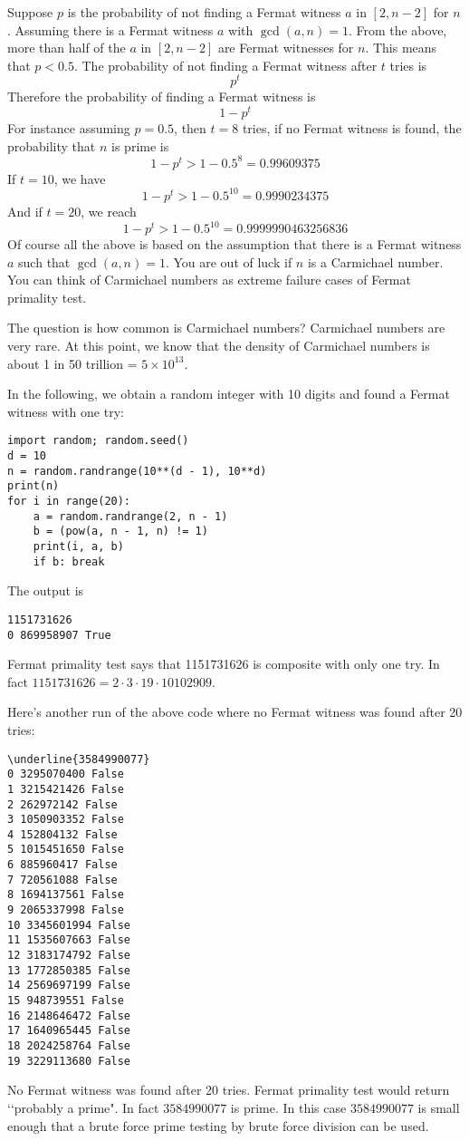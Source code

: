 Suppose $p$ is the probability of not finding a Fermat witness
$a$ in $[2, n-2]$ for $n$.
Assuming there is a Fermat witness $a$ with $\gcd(a, n) = 1$.
From the above, more than half of the $a$ in $[2, n - 2]$ are Fermat
witnesses for $n$.
This means that $p < 0.5$.
The probability of not finding a Fermat witness after $t$ tries is
\[
p^{t}
\]
Therefore the probability of finding a Fermat witness is
\[
1 - p^t
\]
For instance assuming $p = 0.5$, then $t=8$ tries,
if no Fermat witness is found, the probability that $n$ is prime is
\[
1 - p^t > 1 - 0.5^8 = 0.99609375
\]
If $t = 10$, we have
\[
1 - p^t > 1 - 0.5^{10} = 0.9990234375
\]
And if $t = 20$, we reach
\[
1 - p^t > 1 - 0.5^{10} = 0.9999990463256836
\]
Of course all the above is based on the assumption that there is
a Fermat witness $a$ such that $\gcd(a, n) = 1$.
You are out of luck if $n$ is a Carmichael number.
You can think of Carmichael numbers as extreme failure cases of Fermat
primality test.

The question is how common is Carmichael numbers?
Carmichael numbers are very rare.
At this point, we know that the density of Carmichael numbers
is about 1 in 50 trillion = $5 \times 10^{13}$.

\begin{eg}
In the following, we obtain a random integer with 10 digits
and found a Fermat witness with one try:
\begin{Verbatim}[fontsize=\footnotesize,frame=single]
import random; random.seed()
d = 10
n = random.randrange(10**(d - 1), 10**d)
print(n)
for i in range(20):
    a = random.randrange(2, n - 1)
    b = (pow(a, n - 1, n) != 1)
    print(i, a, b)
    if b: break
\end{Verbatim}
The output is
\begin{Verbatim}[fontsize=\footnotesize,frame=single]
1151731626
0 869958907 True
\end{Verbatim}
Fermat primality test says that 1151731626 is composite with only one try.
In fact $1151731626 = 2 \cdot 3 \cdot 19 \cdot 10102909$.
\end{eg}

\begin{eg}
Here's another run of the above code where no Fermat witness was found
after 20 tries:
\begin{Verbatim}[fontsize=\footnotesize,frame=single,commandchars=\\\{\}]
\underline{3584990077}
0 3295070400 False
1 3215421426 False
2 262972142 False
3 1050903352 False
4 152804132 False
5 1015451650 False
6 885960417 False
7 720561088 False
8 1694137561 False
9 2065337998 False
10 3345601994 False
11 1535607663 False
12 3183174792 False
13 1772850385 False
14 2569697199 False
15 948739551 False
16 2148646472 False
17 1640965445 False
18 2024258764 False
19 3229113680 False
\end{Verbatim}
No Fermat witness was found after 20 tries.
Fermat primality test would return \lq\lq probably a prime".
In fact $3584990077$ is prime.
In this case $3584990077$ is small enough that a brute force
prime testing by brute force division can be used.
\end{eg}


